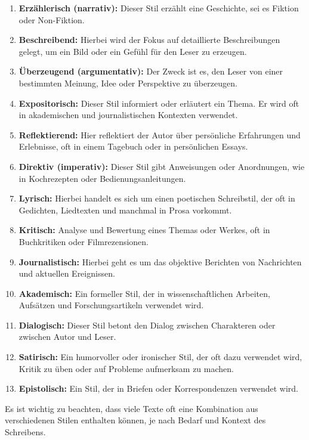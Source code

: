 \documentclass[12pt,a4paper]{scrartcl}
\begin{document}
\begin{enumerate}
\def\labelenumi{\arabic{enumi}.}
\item
  \textbf{Erzählerisch (narrativ):} Dieser Stil erzählt eine Geschichte,
  sei es Fiktion oder Non-Fiktion.
\item
  \textbf{Beschreibend:} Hierbei wird der Fokus auf detaillierte
  Beschreibungen gelegt, um ein Bild oder ein Gefühl für den Leser zu
  erzeugen.
\item
  \textbf{Überzeugend (argumentativ):} Der Zweck ist es, den Leser von
  einer bestimmten Meinung, Idee oder Perspektive zu überzeugen.
\item
  \textbf{Expositorisch:} Dieser Stil informiert oder erläutert ein
  Thema. Er wird oft in akademischen und journalistischen Kontexten
  verwendet.
\item
  \textbf{Reflektierend:} Hier reflektiert der Autor über persönliche
  Erfahrungen und Erlebnisse, oft in einem Tagebuch oder in persönlichen
  Essays.
\item
  \textbf{Direktiv (imperativ):} Dieser Stil gibt Anweisungen oder
  Anordnungen, wie in Kochrezepten oder Bedienungsanleitungen.
\item
  \textbf{Lyrisch:} Hierbei handelt es sich um einen poetischen
  Schreibstil, der oft in Gedichten, Liedtexten und manchmal in Prosa
  vorkommt.
\item
  \textbf{Kritisch:} Analyse und Bewertung eines Themas oder Werkes, oft
  in Buchkritiken oder Filmrezensionen.
\item
  \textbf{Journalistisch:} Hierbei geht es um das objektive Berichten
  von Nachrichten und aktuellen Ereignissen.
\item
  \textbf{Akademisch:} Ein formeller Stil, der in wissenschaftlichen
  Arbeiten, Aufsätzen und Forschungsartikeln verwendet wird.
\item
  \textbf{Dialogisch:} Dieser Stil betont den Dialog zwischen
  Charakteren oder zwischen Autor und Leser.
\item
  \textbf{Satirisch:} Ein humorvoller oder ironischer Stil, der oft dazu
  verwendet wird, Kritik zu üben oder auf Probleme aufmerksam zu machen.
\item
  \textbf{Epistolisch:} Ein Stil, der in Briefen oder Korrespondenzen
  verwendet wird.
\end{enumerate}

Es ist wichtig zu beachten, dass viele Texte oft eine Kombination aus
verschiedenen Stilen enthalten können, je nach Bedarf und Kontext des
Schreibens.
\end{document}
